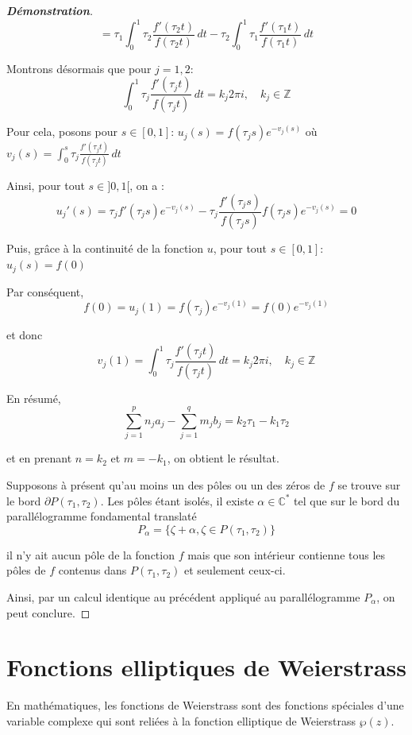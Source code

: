 \documentclass[12pt]{article}
\begin{document}
\begin{proof}[\textbf{Démonstration}]
        \[
        = \tau_1 \int_0^1 \tau_2 \frac{f'(\tau_2 t)}{f(\tau_2 t)} \, dt - \tau_2 \int_0^1 \tau_1 \frac{f'(\tau_1 t)}{f(\tau_1 t)} \, dt
        \]
        
        Montrons désormais que pour \( j = 1, 2 \):
        \[
        \int_0^1 \tau_j \frac{f'(\tau_j t)}{f(\tau_j t)} \, dt = k_j 2\pi i, \quad k_j \in \mathbb{Z}
        \]
        
        Pour cela, posons pour \( s \in [0,1] \): \( u_j(s) = f(\tau_j s)e^{-v_j(s)} \) où \( v_j(s) = \int_0^s \tau_j \frac{f'(\tau_j t)}{f(\tau_j t)} \, dt \)
        
        Ainsi, pour tout \( s \in ]0, 1[ \), on a :
        \[
        u_j'(s) = \tau_j f'(\tau_j s)e^{-v_j(s)} - \tau_j \frac{f'(\tau_j s)}{f(\tau_j s)} f(\tau_j s)e^{-v_j(s)} = 0
        \]
        
        Puis, grâce à la continuité de la fonction \( u \), pour tout \( s \in [0,1] \): \( u_j(s) = f(0) \)
        
        Par conséquent,
        \[
        f(0) = u_j(1) = f(\tau_j)e^{-v_j(1)} = f(0)e^{-v_j(1)}
        \]
        
        et donc
        \[
        v_j(1) = \int_0^1 \tau_j \frac{f'(\tau_j t)}{f(\tau_j t)} \, dt = k_j 2\pi i, \quad k_j \in \mathbb{Z}
        \]
        
        En résumé,
        \[
        \sum_{j=1}^p n_j a_j - \sum_{j=1}^q m_j b_j = k_2 \tau_1 - k_1 \tau_2
        \]
        
        et en prenant \( n = k_2 \) et \( m = -k_1 \), on obtient le résultat.
        
        Supposons à présent qu'au moins un des pôles ou un des zéros de \( f \) se trouve sur le bord \( \partial P(\tau_1, \tau_2) \). Les pôles étant isolés, il existe \( \alpha \in \mathbb{C}^* \) tel que sur le bord du parallélogramme fondamental translaté
        \[
        P_\alpha = \{\zeta + \alpha, \zeta \in P(\tau_1, \tau_2)\}
        \]
        
        il n'y ait aucun pôle de la fonction \( f \) mais que son intérieur contienne tous les pôles de \( f \) contenus dans \( P(\tau_1, \tau_2) \) et seulement ceux-ci.
        
        Ainsi, par un calcul identique au précédent appliqué au parallélogramme \( P_\alpha \), on peut conclure.

    \end{proof}
    \section{Fonctions elliptiques de Weierstrass}
    En mathématiques, les fonctions de Weierstrass sont des fonctions spéciales d'une variable complexe qui sont reliées à la fonction elliptique de Weierstrass $\wp(z)$.
    
\end{document}
